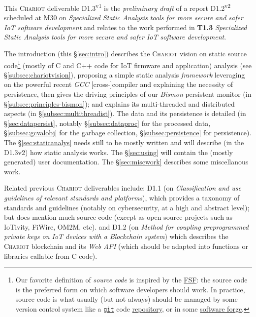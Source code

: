 This \textsc{Chariot} deliverable D1.3\textsuperscript{v1} is the
\emph{preliminary draft} of a report D1.2\textsuperscript{v2} scheduled at M30 on
\emph{Specialized Static Analysis tools for more secure and safer IoT
  software development} and relates to the work performed in
\textbf{T1.3} \emph{Specialized Static Analysis tools for more secure
  and safer IoT software development}.

The introduction (this \S\ref{sec:intro}) describes the
\textsc{Chariot} vision on static source code\footnote{Our favorite
  definition of \emph{source code} is inspired by the
  \href{https://www.fsf.org/}{FSF}: the source code is the preferred
  form on which software developers should work. In practice, source
  code is what usually (but not always) should be managed by some
  version control system like a
  \href{http://git-scm.com/}{\texttt{git}} code 
  \href{https://en.wikipedia.org/wiki/Comparison_of_source-code-hosting\_facilities}{repository},
  or in some 
  \href{https://en.wikipedia.org/wiki/Forge\_(software)}{software
    forge}.}   (mostly of C and C++ code for IoT
firmware and application) analysis (see \S\ref{subsec:chariotvision}),
proposing a simple static analysis \emph{framework} leveraging on the
powerful recent \emph{GCC} [cross-]compiler and explaining the
necessity of persistence, then gives the driving principles of our
\emph{Bismon} persistent monitor (in \S\ref{subsec:principles-bismon});
and explains its multi-threaded and distributed aspects (in
\S\ref{subsec:multithreadist}). The data and its persistence is
detailed (in \S\ref{sec:datapersist}, notably \S\ref{subsec:dataproc}
for the processed data, \S\ref{subsec:gcvalobj} for the garbage
collection, \S\ref{subsec:persistence} for persistence).  The
\S\ref{sec:staticanalys} needs still to be mostly written and will
describe (in the D1.3v2) how static analysis works. The
\S\ref{sec:using} will contain the (mostly generated) user
documentation. The \S\ref{sec:miscwork} describes some miscellanous
work.


Related previous \textsc{Chariot} deliverables include: D1.1 (on
\emph{Classification and use guidelines of relevant standards and
  platforms}), which provides a taxonomy of standards and guidelines
(notably on cybersecurity, at a high and abstract level); but does
mention much source code (except as open source projects such as
IoTivity, FiWire, OM2M, etc). and D1.2 (on \emph{Method for coupling
  preprogrammed private keys on IoT devices with a Blockchain system})
which describes the \textsc{Chariot} blockchain and its \emph{Web API}
(which should be adapted into functions or libraries callable from C
code).

